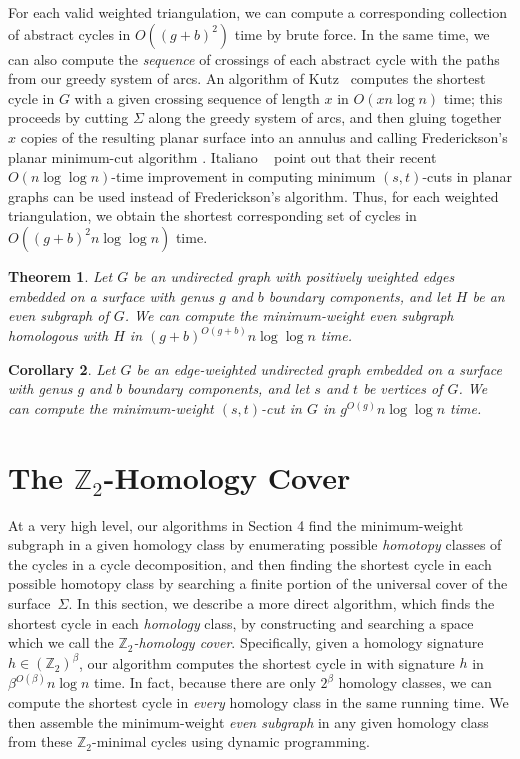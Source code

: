 \documentclass[11pt,twoside]{article}
\def\Z{\mathbb{Z}}
\newtheorem{theorem}{Theorem}[section]
\newtheorem{corollary}[theorem]{Corollary}
\begin{document}
For each valid weighted triangulation, we can compute a corresponding collection of abstract cycles in $O((g+b)^2)$ time by brute force.  In the same time, we can also compute the \emph{sequence} of crossings of each abstract cycle with the paths from our greedy system of arcs.  An algorithm of Kutz~\cite{k-csnco-06} computes the shortest cycle in $G$ with a given crossing sequence of length $x$ in $O(x n \log n)$ time; this proceeds by cutting $\Sigma$ along the greedy system of arcs, and then gluing together $x$ copies of the resulting planar surface into an annulus and calling Frederickson's planar minimum-cut algorithm \cite{f-faspp-87}.
Italiano \etal~\cite{insw-iamcmf-11} point out that their recent $O(n \log \log n)$-time improvement in computing minimum $(s,t)$-cuts in planar graphs can be used instead of Frederickson's algorithm. 
Thus, for each weighted triangulation, we obtain the shortest corresponding set of cycles in $O((g+b)^2 n \log \log n)$ time.

\begin{theorem}
\label{Th:Z2-minimal-crossing}
Let $G$ be an undirected graph with positively weighted edges embedded on a surface with genus $g$ and $b$ boundary components, and let $H$ be an even subgraph of $G$. We can compute the minimum-weight even subgraph homologous with $H$ in $(g+b)^{O(g+b)} n\log \log n$ time.
\end{theorem}

\begin{corollary}
\label{C:min-cut-crossing}
Let $G$ be an edge-weighted undirected graph embedded on a surface with genus $g$ and $b$ boundary components, and let $s$ and $t$ be vertices of $G$.  We can compute the minimum-weight $(s,t)$-cut in $G$ in $g^{O(g)} n\log \log n$ time.
\end{corollary}

\section{The $\Z_2$-Homology Cover}
\label{sec:homcover}


At a very high level, our algorithms in Section 4 find the minimum-weight subgraph in a given homology class by enumerating possible \emph{homotopy} classes of the cycles in a cycle decomposition, and then finding the shortest cycle in each possible homotopy class by searching a finite portion of the universal cover of the surface~$\Sigma$.  In this section, we describe a more direct algorithm, which finds the shortest cycle in each \emph{homology} class, by constructing and searching a space which we call the \emph{$\Z_2$-homology cover}.
Specifically, given a homology signature $h\in (\Z_2)^\beta$, our algorithm computes the shortest cycle in with signature $h$ in $\beta^{O(\beta)} n \log n$ time.
In fact, because there are only $2^\beta$ homology classes, we can compute the shortest cycle in \emph{every} homology class in the same running time.
We then assemble the minimum-weight \emph{even subgraph} in any given homology class from these $\Z_2$-minimal cycles using dynamic programming.
 
\end{document}
